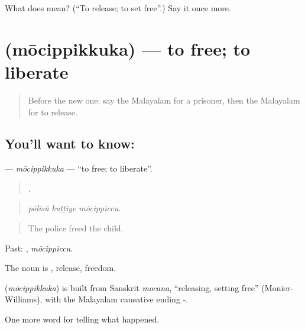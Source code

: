 \begin{tcolorbox}[breakable,colback=teal!4,colframe=teal!35!black,title={Before you move on}]
What does  mean? (\textquotedblleft{}To release; to set free\textquotedblright{}.) Say it once more.
\end{tcolorbox}
\section[\texorpdfstring{\ml{മോചിപ്പിക്കുക} (mōcippikkuka)}{മോചിപ്പിക്കുക (mōcippikkuka)}]{ (mōcippikkuka) — to free; to liberate}

\label{lesson:ML-C371-mocippikkuka}



\begin{quote}
Before the new one: say the Malayalam for a prisoner, then the Malayalam for to release.
\end{quote}

\subsection*{You'll want to know: }
\textbf{} — \emph{mōcippikkuka} — \textquotedblleft{}to free; to liberate\textquotedblright{}.

\begin{quote}
  .
\end{quote}

\begin{quote}
\emph{pōlīsŭ kuṭṭiye mōcippiccu.}
\end{quote}

\begin{quote}
The police freed the child.
\end{quote}

Past: , \emph{mōcippiccu}.

The noun is , release, freedom.

\begin{cousinweb}
\textbf{} (\emph{mōcippikkuka}) is built from Sanskrit \emph{mocana}, \textquotedblleft{}releasing, setting free\textquotedblright{} (Monier-Williams), with the Malayalam causative ending -.
\end{cousinweb}

\begin{grammarlens}[title={What you've built}]
One more word for telling what happened.
\end{grammarlens}

